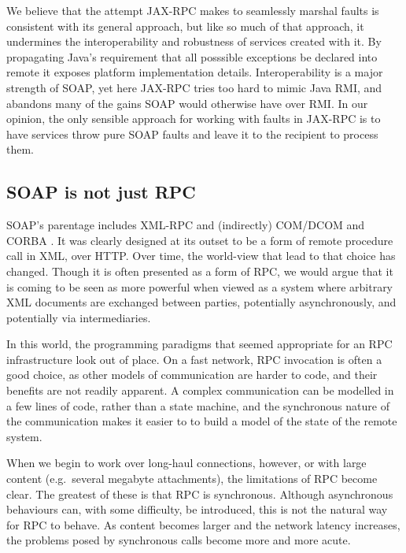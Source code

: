 We believe that the attempt JAX-RPC makes to seamlessly marshal faults
is consistent with its general approach, but like so much of that
approach, it undermines the interoperability and robustness of
services created with it. By propagating Java's requirement that all
posssible exceptions be declared into remote it exposes platform
implementation details. Interoperability is a major strength of SOAP,
yet here JAX-RPC tries too hard to mimic Java RMI, and abandons many
of the gains SOAP would otherwise have over RMI. In our opinion, the
only sensible approach for working with faults in JAX-RPC is to have
services throw pure SOAP faults and leave it to the recipient to
process them.

\subsection{SOAP is not just RPC}
\label{objections:soap-not-just-rmi}

SOAP's parentage includes XML-RPC \cite{winer:xmlrpc} and (indirectly)
COM/DCOM \cite{dbox:SoapHistory,dbox:com}and CORBA
\cite{vinoski:CORBA}. It was clearly designed at its outset to be a
form of remote procedure call in XML, over HTTP. Over time, the
world-view that lead to that choice has changed. Though it is often
presented as a form of RPC, we would argue that it is coming to be
seen as more powerful when viewed as a system where arbitrary XML
documents are exchanged between parties, potentially asynchronously,
and potentially via intermediaries.

In this world, the programming paradigms that seemed appropriate for
an RPC infrastructure look out of place. On a fast network, RPC
invocation is often a good choice, as other models of communication
are harder to code, and their benefits are not readily apparent. A complex
communication can be modelled in a few lines of code, rather than a state
machine, and the synchronous nature of the communication makes it easier to
to build a model of the state of the remote system.  

When we begin to work over long-haul connections, however, or with
large content (e.g.\ several megabyte attachments), the limitations of
RPC become clear. The greatest of these is that RPC is
synchronous. Although asynchronous behaviours can, with some
difficulty, be introduced, this is not the natural way for RPC to
behave. As content becomes larger and the network latency increases,
the problems posed by synchronous calls become more and more acute.


